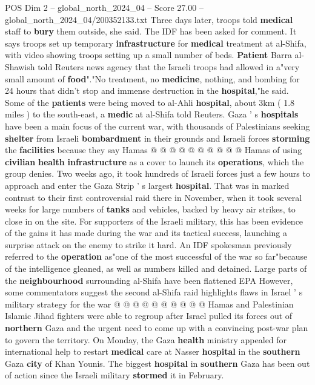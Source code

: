 \begin{textsample}{POS Dim 2 – global\_north\_2024\_04 – Score 27.00 – global\_north\_2024\_04/200352133.txt}
Three days later, troops told \textbf{medical} staff to \textbf{bury} them outside, she said.
The IDF has been asked for comment.
It says troops set up temporary \textbf{infrastructure} for \textbf{medical} treatment at al-Shifa, with video showing troops setting up a small number of beds. \textbf{Patient} Barra al-Shawish told Reuters news agency that the Israeli troops had allowed in a"very small amount of \textbf{food}"."No treatment, no \textbf{medicine}, nothing, and bombing for 24 hours that didn't stop and immense destruction in the \textbf{hospital},"he said.
Some of the \textbf{patients} were being moved to al-Ahli \textbf{hospital}, about 3km ( 1.8 miles ) to the south-east, a \textbf{medic} at al-Shifa told Reuters.
Gaza ' s \textbf{hospitals} have been a main focus of the current war, with thousands of Palestinians seeking \textbf{shelter} from Israeli \textbf{bombardment} in their grounds and Israeli forces \textbf{storming} the \textbf{facilities} because they say Hamas @ @ @ @ @ @ @ @ @ @ Hamas of using \textbf{civilian} \textbf{health} \textbf{infrastructure} as a cover to launch its \textbf{operations}, which the group denies.
Two weeks ago, it took hundreds of Israeli forces just a few hours to approach and enter the Gaza Strip ' s largest \textbf{hospital}.
That was in marked contrast to their first controversial raid there in November, when it took several weeks for large numbers of \textbf{tanks} and vehicles, backed by heavy air strikes, to close in on the site.
For supporters of the Israeli military, this has been evidence of the gains it has made during the war and its tactical success, launching a surprise attack on the enemy to strike it hard.
An IDF spokesman previously referred to the \textbf{operation} as"one of the most successful of the war so far"because of the intelligence gleaned, as well as numbers killed and detained.
Large parts of the \textbf{neighbourhood} surrounding al-Shifa have been flattened EPA However, some commentators suggest the second al-Shifa raid highlights flaws in Israel ' s military strategy for the war @ @ @ @ @ @ @ @ @ @ Hamas and Palestinian Islamic Jihad fighters were able to regroup after Israel pulled its forces out of \textbf{northern} Gaza and the urgent need to come up with a convincing post-war plan to govern the territory.
On Monday, the Gaza \textbf{health} ministry appealed for international help to restart \textbf{medical} care at Nasser \textbf{hospital} in the \textbf{southern} Gaza \textbf{city} of Khan Younis.
The biggest \textbf{hospital} in \textbf{southern} Gaza has been out of action since the Israeli military \textbf{stormed} it in February.

\end{textsample}
